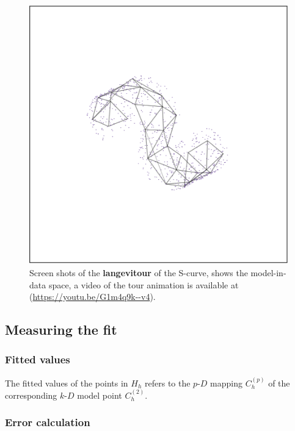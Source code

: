 \documentclass[
  12pt]{article}
\newcommand\pD{$p\text{-}D$}
\newcommand\kD{$k\text{-}D$}
\begin{document}
\begin{figure}[H]
%
\begin{minipage}{0.33\linewidth}
\includegraphics{figures/scurve/sc_3.png}\end{minipage}%

\caption{\label{fig-scurve_sc}Screen shots of the \textbf{langevitour}
of the S-curve, shows the model-in-data space, a video of the tour
animation is available at (\url{https://youtu.be/G1m4q9k--v4}).}

\end{figure}%

\subsection{Measuring the fit}\label{sec-summary}

\subsubsection{Fitted values}\label{fitted-values}

The fitted values of the points in \(H_h\) refers to the \pD{} mapping
\(C_{h}^{(p)}\) of the corresponding \kD{} model point \(C_{h}^{(2)}\).

\subsubsection{Error calculation}\label{error-calculation}
\end{document}
